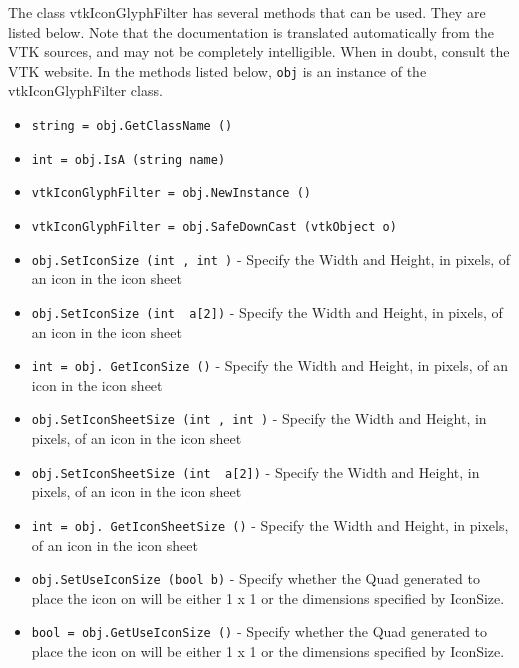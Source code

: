 The class vtkIconGlyphFilter has several methods that can be used.
  They are listed below.
Note that the documentation is translated automatically from the VTK sources,
and may not be completely intelligible.  When in doubt, consult the VTK website.
In the methods listed below, \verb|obj| is an instance of the vtkIconGlyphFilter class.
\begin{itemize}
\item  \verb|string = obj.GetClassName ()|

\item  \verb|int = obj.IsA (string name)|

\item  \verb|vtkIconGlyphFilter = obj.NewInstance ()|

\item  \verb|vtkIconGlyphFilter = obj.SafeDownCast (vtkObject o)|

\item  \verb|obj.SetIconSize (int , int )| -  Specify the Width and Height, in pixels, of an icon in the icon sheet

\item  \verb|obj.SetIconSize (int  a[2])| -  Specify the Width and Height, in pixels, of an icon in the icon sheet

\item  \verb|int = obj. GetIconSize ()| -  Specify the Width and Height, in pixels, of an icon in the icon sheet

\item  \verb|obj.SetIconSheetSize (int , int )| -  Specify the Width and Height, in pixels, of an icon in the icon sheet

\item  \verb|obj.SetIconSheetSize (int  a[2])| -  Specify the Width and Height, in pixels, of an icon in the icon sheet

\item  \verb|int = obj. GetIconSheetSize ()| -  Specify the Width and Height, in pixels, of an icon in the icon sheet

\item  \verb|obj.SetUseIconSize (bool b)| -  Specify whether the Quad generated to place the icon on will be either
 1 x 1 or the dimensions specified by IconSize.

\item  \verb|bool = obj.GetUseIconSize ()| -  Specify whether the Quad generated to place the icon on will be either
 1 x 1 or the dimensions specified by IconSize.


\end{itemize}
